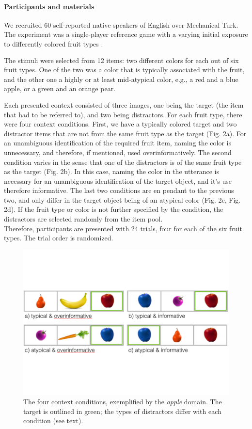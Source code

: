 \documentclass[10pt,letterpaper]{article}
\begin{document}
\paragraph{Participants and materials}
We recruited 60 self-reported native speakers of English over Mechanical Turk. The experiment was a single-player reference game with a varying initial exposure to differently colored fruit types .

The stimuli were selected from 12 items: two different colors for each out of six fruit types. One of the two was a color that is typically associated with the fruit, and the other one a highly or at least mid-atypical color, e.g.,  a red and a blue apple, or a green and an orange pear.

Each presented context consisted of three images, one being the target (the item that had to be referred to), and two being distractors. For each fruit type, there were four context conditions. First, we have a typically colored target and two distractor items that are not from the same fruit type as the target (Fig. 2a). For an unambiguous identification of the required fruit item, naming the color is unnecessary, and therefore, if mentioned, used overinformatively. The second condition varies in the sense that one of the distractors is of the same fruit type as the target (Fig. 2b). In this case, naming the color in the utterance is necessary for an unambiguous identification of the target object, and it's use therefore informative. The last two conditions are en pendant to the previous two, and only differ in the target object being of an atypical color (Fig. 2c, Fig. 2d). If the fruit type or color is not further specified by the condition, the distractors are selected randomly from the item pool. \\Therefore, participants are presented with 24 trials, four for each of the six fruit types. The trial order is randomized.

\begin{figure}[bt!]
\centering
\includegraphics[width=.5\textwidth]{graphs/design}
\caption{The four context conditions, exemplified by the \textit{apple} domain. The target is outlined in green; the types of distractors differ with each condition (see text).
}
\label{fig:design}
\end{figure}
\end{document}
